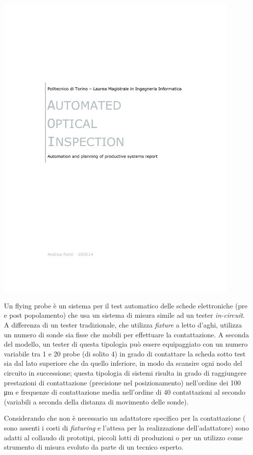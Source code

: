 \includegraphics[clip=true, trim= 50 540 50 120,page=18,width=0.9\textwidth]{materiale/tesina-carlucci.pdf}

Un flying probe è un sistema per il test automatico delle schede elettroniche (pre e post popolamento) che 
usa un sistema di misura simile ad un tester \emph{in-circuit}. A differenza di un tester tradizionale, che utilizza \emph{fixture} a letto d'aghi, utilizza un numero di sonde sia fisse che mobili per effettuare la contattazione. 
A seconda del modello, un tester di questa tipologia può essere equipaggiato con un numero variabile tra 
1 e 20 probe (di solito 4) in grado di contattare la scheda sotto test sia dal lato superiore che da quello inferiore, in modo da scansire ogni nodo del circuito in successione; questa tipologia di sistemi risulta in grado di raggiungere prestazioni di contattazione (precisione nel posizionamento) nell'ordine dei  100 μm e frequenze di contattazione media nell'ordine di 40 contattazioni al secondo (variabili a seconda della distanza di movimento delle sonde). 

Considerando che non è necessario un adattatore specifico per la contattazione ( sono assenti i costi di 
\emph{fixturing} e l'attesa per la realizzazione dell'adattatore) sono adatti al collaudo di prototipi, piccoli lotti di produzioni o per un utilizzo come strumento di misura evoluto da parte di un tecnico esperto.  


